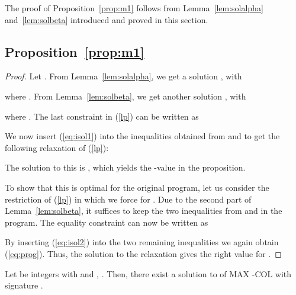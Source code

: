 \documentclass[11pt,a4paper]{article}
\begin{document}
The proof of Proposition~\ref{prop:m1} follows from Lemma~\ref{lem:solalpha} and~\ref{lem:solbeta} introduced and proved in this section.

\subsection*{Proposition~\ref{prop:m1}}
\begin{proof}
  Let .
  From Lemma~\ref{lem:solalpha}, we get a solution , with
  
  where .
  From Lemma~\ref{lem:solbeta}, we get another solution , with
  
  where .
  The last constraint in (\ref{lp}) can be written as
  
  We now insert (\ref{eq:isol1}) into the inequalities obtained from  and
   to get the following relaxation of (\ref{lp}):
  
  The solution to this is ,
  which yields the -value in the proposition.

  To show that this is optimal for the original program,
  let us consider the restriction of (\ref{lp}) in which we force
   for .
  Due to the second part of Lemma~\ref{lem:solbeta}, it suffices to
  keep the two inequalities from  and  in the program.
  The equality constraint can now be written as
  
  By inserting (\ref{eq:isol2}) into the two remaining
  inequalities we again obtain (\ref{eq:prog}).
  Thus, the solution to the relaxation gives the right value for .
\end{proof}

\begin{lemma}
\label{lem:solalpha}
Let  be integers with  and , . Then, there exist a solution  to  of MAX -COL with signature . 
\end{lemma}
\end{document}
